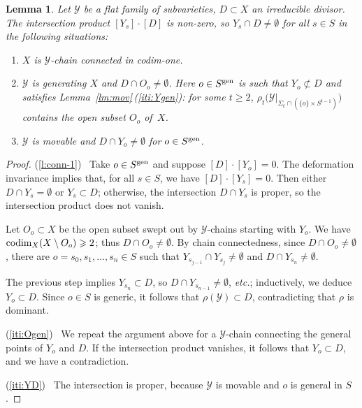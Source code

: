 \documentclass[10pt,a4paper]{article}
\numberwithin{equation}{section}
\newtheorem{m-lemma}[m-theorem]{Lemma}
\theoremstyle{definition}
\theoremstyle{remark}
\let\cal\mathcal
\let\ges\geqslant
\let\sm\setminus
\newcommand{\codim}{\mathop{\rm codim}\nolimits}
\newcommand{\gen}{{\rm gen}}
\newcommand{\cY}{{\cal Y}}
\newcommand{\XX}{X}
\newcommand{\YY}{Y}
\begin{document}
\begin{m-lemma}\label{lm:conn}
Let $\cY$ be a flat family of subvarieties, $D\subset\XX$ an irreducible divisor. The intersection product $[\YY_s]\cdot[D]$ is non-zero, so $\YY_s\cap D\neq\emptyset$ for all $s\in S$ in the following situations:
\begin{enumerate}
\item\label{l:conn-1}
$\XX$ is $\cY$-chain connected in codim-one.
\item\label{iti:Ogen} 
  $\cY$ is generating $\XX$ and $D\cap O_o\neq\emptyset$. Here $o\in S^\gen$ is such that $\YY_o\not\subset D$ and satisfies Lemma~\ref{lm:mov}\,{\rm(\ref{iti:Ygen})}: for some $t\ges 2$, $\rho_t\bigl(\cY|_{\Sigma_t\cap(\{o\}\times S^{t-1})}\bigr)$ contains the open subset $O_o$ of\, $\XX$. 
\item\label{iti:YD} 
$\cY$ is movable and $D\cap\YY_o\neq\emptyset$ for $o\in S^\gen$.
\end{enumerate}

\end{m-lemma}

\begin{proof}
(\ref{l:conn-1})~ Take $o\in S^\gen$ and suppose $[D]\cdot [\YY_o]=0$. The deformation invariance implies that, for all $s\in S$, we have $[D]\cdot[\YY_s]=0$. Then either $D\cap \YY_s=\emptyset$ or $\YY_s\subset D$; otherwise, the intersection $D\cap\YY_s$ is proper, so the intersection product does not vanish.  

 Let $O_o\subset X$ be the open subset swept out by $\cY$-chains starting with $\YY_o$. We have $\codim_\XX(\XX\sm O_o)\ges2$; thus $D\cap O_o\neq\emptyset$.  By chain connectedness, since $D\cap O_o\neq\emptyset$, there are $o=s_0,s_1,\dots,s_n\in S$ such that 
$\YY_{s_{j-1}}\cap \YY_{s_j}\neq\emptyset$ and $D\cap \YY_{s_n}\neq\emptyset$.

 The previous step implies $\YY_{s_n}\subset D$, so $D\cap \YY_{s_{n-1}} \neq\emptyset$, \textit{etc.}; inductively, we deduce $\YY_o\subset D$. Since $o\in S$ is generic, it follows that $\rho(\cY)\subset D$, contradicting that $\rho$ is dominant.

(\ref{iti:Ogen})~ 
 We repeat the argument above for a $\cY$-chain connecting the general points of $\YY_o$ and $D$. If the intersection product vanishes, it follows that $\YY_o\subset D$, and we have a contradiction. 
 
 (\ref{iti:YD})~ 
The intersection is proper, because $\cY$ is movable and $o$ is general in $S$.
\end{proof}
\end{document}
